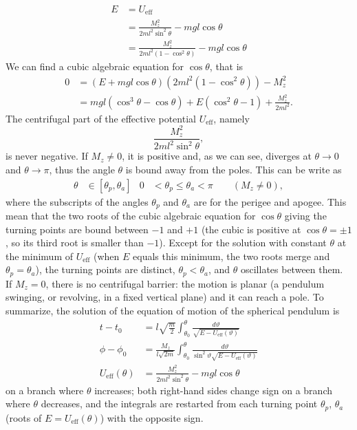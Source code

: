 \begin{problem}[title={Spherical pendulum}]
{\begin{align*}
    E &= U_{\text{eff}} \\
    &= \frac{M_z^2}{2ml^2\sin^2{\theta}} - mgl\cos{\theta} \\
    &= \frac{M_z^2}{2ml^2\left(1-\cos^2{\theta}\right)} - mgl\cos{\theta}
\end{align*}
We can find a cubic algebraic equation for $\cos{\theta}$, that is
\begin{align*}
    0 &= \left( E + mgl\cos{\theta} \right) \left( 2ml^2 \left( 1 - \cos^2{\theta} \right) \right) - M_z^2 \\
      &= mgl\left(\cos^3{\theta} - \cos{\theta}\right) + E\left(\cos^2{\theta} - 1\right) + \frac{M_z^2}{2ml^2} .
\end{align*}
The centrifugal part of the effective potential $U_{\text{eff}}$, namely
\begin{equation*}
    \frac{M_z^2}{2ml^2\sin^2{\theta}},
\end{equation*}
is never negative. If $M_z \neq 0$, it is positive and, as we can see, diverges at $\theta \rightarrow 0$ and $\theta \rightarrow \pi$, thus the angle $\theta$ is bound away from the poles. This can be write as
\begin{align*}
  \theta &\in \left[ \theta_p, \theta_a\right] & 0 &< \theta_p \leq \theta_a < \pi \qquad (M_z \neq 0),
\end{align*}
where the subscripts of the angles $\theta_p$ and $\theta_a$ are for the perigee and apogee. This mean that the two roots of the cubic algebraic equation for $\cos{\theta}$ giving the turning points are bound between $-1$ and $+1$ (the cubic is positive at $\cos{\theta}=\pm 1$, so its third root is smaller than $-1$). Except for the solution with constant $\theta$ at the minimum of $U_{\text{eff}}$ (when $E$ equals this minimum, the two roots merge and $\theta_p = \theta_a$), the turning points are distinct, $\theta_p < \theta_a$, and $\theta$ oscillates between them. If $M_z = 0$, there is no centrifugal barrier: the motion is planar (a pendulum swinging, or revolving, in a fixed vertical plane) and it can reach a pole. To summarize, the solution of the equation of motion of the spherical pendulum is
}
{
\begin{align*}
  t - t_0 &= l\sqrt{\frac{m}{2}}\int_{\theta_0}^{\theta} \frac{d\vartheta}{\sqrt{E - U_{\text{eff}}(\vartheta)}} \\
  \phi - \phi_0 &= \frac{M_z}{l\sqrt{2m}}\int_{\theta_0}^{\theta}\frac{d\vartheta}{\sin^2{\vartheta}\sqrt{E - U_{\text{eff}}(\vartheta)}} \\
  U_{\text{eff}}(\theta) &= \frac{M_z^2}{2ml^2\sin^2{\theta}} - mgl\cos{\theta}
\end{align*}
on a branch where $\theta$ increases; both right-hand sides change sign on a branch where $\theta$ decreases, and the integrals are restarted from each turning point $\theta_p$, $\theta_a$ (roots of $E = U_{\text{eff}}(\theta)$) with the opposite sign.
}
\end{problem}

